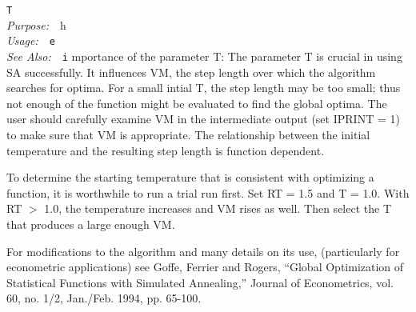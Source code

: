 \documentclass{book}
\makeatletter
\newif\ifpdf
\newenvironment{isisfunction}[4]%
{\index{{#1}@{\tt #1}}%
  \ifpdf
  \else
     \addcontentsline{toc}{subsection}{{#1} -- {#2}}
  \fi
  \vbox{
          \vspace*{\baselineskip}
          {\LARGE\tt #1}\vspace*{\baselineskip}\\
          {{\it Purpose:}~~{#2}}\\
          {{\it Usage:}~~{\tt #3}}\\
          {{\it See Also:}~~{\tt #4}}
       }
}%
{ }
\makeatother
\begin{document}
\begin{isisfunction}
The importance of the parameter T:
   The parameter T is crucial in using SA successfully. It influences
VM, the step length over which the algorithm searches for optima. For
a small intial T, the step length may be too small; thus not enough
of the function might be evaluated to find the global optima. The user
should carefully examine VM in the intermediate output (set IPRINT =
1) to make sure that VM is appropriate. The relationship between the
initial temperature and the resulting step length is function
dependent.

   To determine the starting temperature that is consistent with
optimizing a function, it is worthwhile to run a trial run first. Set
RT = 1.5 and T = 1.0. With RT $>$ 1.0, the temperature increases and VM
rises as well. Then select the T that produces a large enough VM.

For modifications to the algorithm and many details on its
use, (particularly for econometric applications) see Goffe, Ferrier
and Rogers, ``Global Optimization of Statistical Functions
with Simulated Annealing,'' Journal of Econometrics, vol. 60, no.
1/2, Jan./Feb. 1994, pp. 65-100.

\end{isisfunction}
\end{document}
